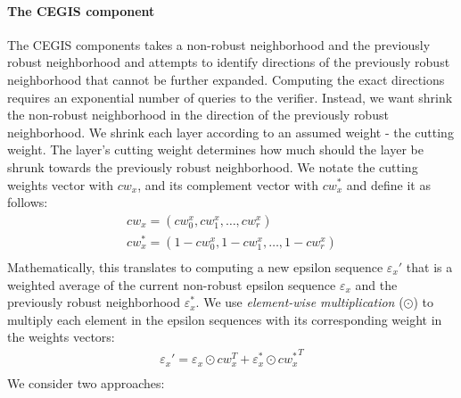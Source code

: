     \paragraph{The CEGIS component}
    The CEGIS components takes a non-robust neighborhood and the previously robust neighborhood and attempts to identify directions of the previously robust neighborhood that cannot be further expanded. %
    Computing the exact directions requires an exponential number of queries to the verifier.
    Instead, we want shrink the non-robust neighborhood in the direction of the previously robust neighborhood.
    We shrink each layer according to an assumed weight - the cutting weight.
    The layer's cutting weight determines how much should the layer be shrunk towards the previously robust neighborhood.
    We notate the cutting weights vector with $cw_x$, and its complement vector with $cw_x^*$ and define it as follows:
    \begin{gather*}
        cw_x = (cw_0^x, cw_1^x, \ldots, cw_r^x)\\
        cw_x^* = (1 - cw_0^x, 1 - cw_1^x, \ldots, 1 - cw_r^x)\\
    \end{gather*}
    Mathematically, this translates to computing a new epsilon sequence $\varepsilon_x'$ that is a weighted average of the current non-robust epsilon sequence $\varepsilon_x$ and the previously robust neighborhood $\varepsilon_x^*$.
    We use \emph{element-wise multiplication} ($\odot$) to multiply each element in the epsilon sequences with its corresponding weight in the weights vectors:
    \begin{gather*}
        {\varepsilon_x}' = \varepsilon_x \odot cw_x^T + \varepsilon_x^* \odot {cw_x^*}^T\\
    \end{gather*}
    We consider two approaches:
